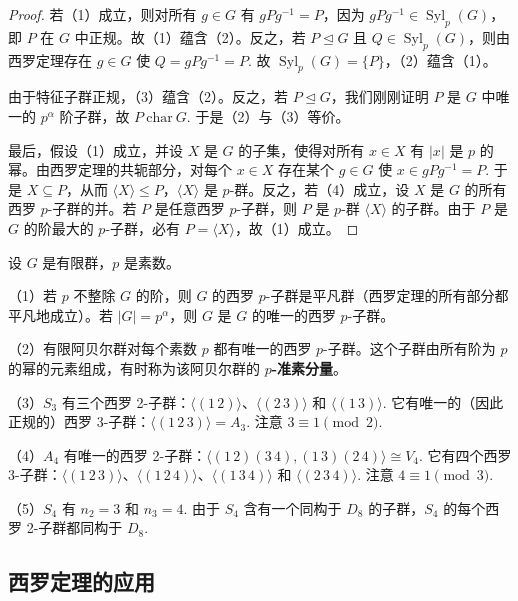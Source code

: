 \begin{proof}
若（1）成立，则对所有 \(g \in G\) 有 \(gPg^{-1} = P\)，因为 \(gPg^{-1} \in \operatorname{Syl}_p(G)\)，即 \(P\) 在 \(G\) 中正规。故（1）蕴含（2）。反之，若 \(P \trianglelefteq G\) 且 \(Q \in \operatorname{Syl}_p(G)\)，则由西罗定理存在 \(g \in G\) 使 \(Q = gPg^{-1} = P\). 故 \(\operatorname{Syl}_p(G) = \{P\}\)，（2）蕴含（1）。

由于特征子群正规，（3）蕴含（2）。反之，若 \(P \trianglelefteq G\)，我们刚刚证明 \(P\) 是 \(G\) 中唯一的 \(p^\alpha\) 阶子群，故 \(P\ \mathrm{char}\ G\). 于是（2）与（3）等价。

最后，假设（1）成立，并设 \(X\) 是 \(G\) 的子集，使得对所有 \(x \in X\) 有 \(|x|\) 是 \(p\) 的幂。由西罗定理的共轭部分，对每个 \(x \in X\) 存在某个 \(g \in G\) 使 \(x \in gPg^{-1} = P\). 于是 \(X \subseteq P\)，从而 \(\langle X \rangle \leq P\)，\(\langle X \rangle\) 是 \(p\)-群。反之，若（4）成立，设 \(X\) 是 \(G\) 的所有西罗 \(p\)-子群的并。若 \(P\) 是任意西罗 \(p\)-子群，则 \(P\) 是 \(p\)-群 \(\langle X \rangle\) 的子群。由于 \(P\) 是 \(G\) 的阶最大的 \(p\)-子群，必有 \(P = \langle X \rangle\)，故（1）成立。
\end{proof}

\begin{example}
设 \(G\) 是有限群，\(p\) 是素数。

（1）若 \(p\) 不整除 \(G\) 的阶，则 \(G\) 的西罗 \(p\)-子群是平凡群（西罗定理的所有部分都平凡地成立）。若 \(|G| = p^\alpha\)，则 \(G\) 是 \(G\) 的唯一的西罗 \(p\)-子群。

（2）有限阿贝尔群对每个素数 \(p\) 都有唯一的西罗 \(p\)-子群。这个子群由所有阶为 \(p\) 的幂的元素组成，有时称为该阿贝尔群的 \textbf{\(p\)-准素分量}。

（3）\(S_3\) 有三个西罗 2-子群：\(\langle (1\,2) \rangle\)、\(\langle (2\,3) \rangle\) 和 \(\langle (1\,3) \rangle\). 它有唯一的（因此正规的）西罗 3-子群：\(\langle (1\,2\,3) \rangle = A_3\). 注意 \(3 \equiv 1 \pmod{2}\).

（4）\(A_4\) 有唯一的西罗 2-子群：\(\langle (1\,2)(3\,4), (1\,3)(2\,4) \rangle \cong V_4\). 它有四个西罗 3-子群：\(\langle (1\,2\,3) \rangle\)、\(\langle (1\,2\,4) \rangle\)、\(\langle (1\,3\,4) \rangle\) 和 \(\langle (2\,3\,4) \rangle\). 注意 \(4 \equiv 1 \pmod{3}\).

（5）\(S_4\) 有 \(n_2 = 3\) 和 \(n_3 = 4\). 由于 \(S_4\) 含有一个同构于 \(D_8\) 的子群，\(S_4\) 的每个西罗 2-子群都同构于 \(D_8\).
\end{example}

\subsection*{西罗定理的应用}

